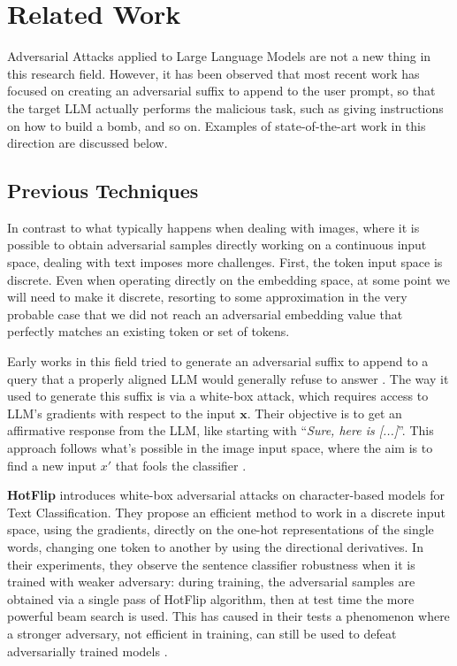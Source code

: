 \documentclass[../thesis]{subfiles}
\begin{document}
\chapter{Related Work}
Adversarial Attacks applied to Large Language Models are not a new thing in this research field.
However, it has been observed that most recent work has focused on creating an adversarial suffix to append to the user prompt, so that the target LLM actually performs the malicious task, such as giving instructions on how to build a bomb, and so on. Examples of state-of-the-art work in this direction are discussed below.

\section{Previous Techniques}
\label{sec:related_work__previous_techniques_attacks}
In contrast to what typically happens when dealing with images, where it is possible to obtain adversarial samples directly working on a continuous input space, dealing with text imposes more challenges.
First, the token input space is discrete. Even when operating directly on the embedding space, at some point we will need to make it discrete, resorting to some approximation in the very probable case that we did not reach an adversarial embedding value that perfectly matches an existing token or set of tokens.

Early works in this field tried to generate an adversarial suffix to append to a query that a properly aligned LLM would generally refuse to answer \citep{gcg-carlini} \citep{autoprompt}.
The way it used to generate this suffix is via a white-box attack, which requires access to LLM's gradients with respect to the input $\mathbf{x}$.
Their objective is to get an affirmative response from the LLM, like starting with ``\emph{Sure, here is [...]}''.
This approach follows what's possible in the image input space, where the aim is to find a new input $x'$ that fools the classifier \citep{carlini-wagner-image-attack}.

\textbf{HotFlip} \citep{ebrahimi2018hotflipwhiteboxadversarialexamples} introduces white-box adversarial attacks on character-based models for Text Classification.
They propose an efficient method to work in a discrete input space, using the gradients, directly on the one-hot representations of the single words, changing one token to another by using the directional derivatives.
In their experiments, they observe the sentence classifier robustness
when it is trained with weaker adversary: during training, the adversarial samples are obtained via a single pass of HotFlip algorithm, then at test time the more powerful beam search is used. This has caused in their tests a phenomenon where a stronger adversary, not efficient in training, can still be used to defeat adversarially trained models \citep{carlini-wagner-image-attack}.
\end{document}
